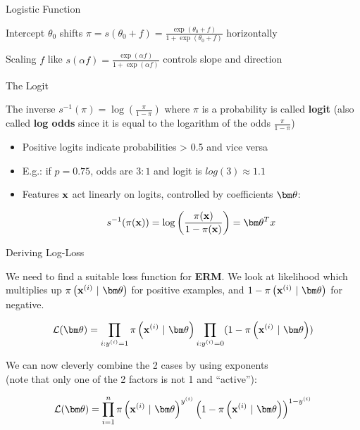 \documentclass[11pt,compress,t,notes=noshow, xcolor=table]{beamer}
\begin{document}
\begin{vbframe}{Logistic Function}

Intercept $\theta_0$ shifts $\pi = s(\theta_0 + f) = \frac{\exp(\theta_0 + f)}{1+\exp(\theta_0 + f)}$ horizontally


Scaling $f$ like $s(\alpha f) = \frac{\exp(\alpha f)}{1+\exp(\alpha f)}$ controls slope and direction


\end{vbframe}

\begin{vbframe}{The Logit}

The inverse $s^{-1}(\pi) = \log\left(\frac{\pi}{1 - \pi}\right)$ where $\pi$ is a probability is called \textbf{logit} (also called \textbf{log odds} since it is equal to the logarithm of the odds $\frac{\pi}{1-\pi}$)


\begin{itemize}

\item Positive logits indicate probabilities > 0.5 and vice versa

\item E.g.: if $p = 0.75$, odds are $3:1$ and logit is $log(3) \approx 1.1$

\item Features $\mathbf{x}$ act linearly on logits, controlled by coefficients $\thetav$:

$$
s^{-1}(\pix) = \log\left(\frac{\pix}{1 - \pix}\right) = \thetav^T x
$$

\end{itemize}


\end{vbframe}

\begin{vbframe}{Deriving Log-Loss}

We need to find a suitable loss function for \textbf{ERM}. We look at likelihood which multiplies up $\pixit$ for positive examples, and $1-\pixit$ for negative. 


$$
\LLt = \prod_{i: \yi = 1} \pixit \prod_{i: \yi = 0} (1 - \pixit) 
$$

We can now cleverly combine the 2 cases by using exponents \\
(note that only one of the 2 factors is not 1 and \enquote{active}):

$$
\LLt = \prodin \pixit^{\yi} \left(1-\pixit\right)^{1-\yi}
$$

\end{vbframe}
\end{document}
